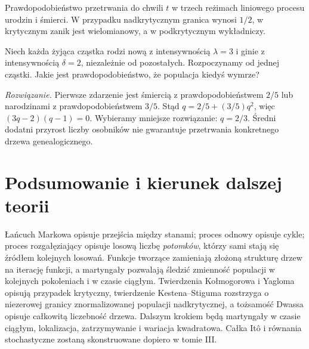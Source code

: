 \begin{center}
\par\smallskip\small Prawdopodobieństwo przetrwania
do chwili $t$ w trzech reżimach liniowego procesu
urodzin i śmierci. W przypadku nadkrytycznym
granica wynosi $1/2$, w krytycznym zanik jest
wielomianowy, a w podkrytycznym wykładniczy.
\end{center}

\begin{zadanie}
Niech każda żyjąca cząstka rodzi nową z intensywnością
$\lambda=3$ i ginie z intensywnością $\delta=2$,
niezależnie od pozostałych. Rozpoczynamy od jednej cząstki.
Jakie jest prawdopodobieństwo, że populacja kiedyś wymrze?

\emph{Rozwiązanie.} Pierwsze zdarzenie jest śmiercią
z prawdopodobieństwem $2/5$ lub narodzinami z prawdopodobieństwem
$3/5$. Stąd $q=2/5+(3/5)q^2$, więc
$(3q-2)(q-1)=0$.
Wybieramy mniejsze rozwiązanie: $q=2/3$.
Średni dodatni przyrost liczby osobników nie gwarantuje
przetrwania konkretnego drzewa genealogicznego.
\end{zadanie}




\section{Podsumowanie i kierunek dalszej teorii}
Łańcuch Markowa opisuje przejścia między stanami;
proces odnowy opisuje cykle; proces rozgałęziający
opisuje losową liczbę \emph{potomków}, którzy sami
stają się źródłem kolejnych losowań. Funkcje tworzące
zamieniają złożoną strukturę drzew na iterację funkcji,
a martyngały pozwalają śledzić zmienność populacji
w kolejnych pokoleniach i w czasie ciągłym.
Twierdzenia Kołmogorowa i Yagloma opisują przypadek
krytyczny, twierdzenie Kestena--Stiguma rozstrzyga
o niezerowej granicy znormalizowanej populacji
nadkrytycznej, a tożsamość Dwassa opisuje całkowitą
liczebność drzewa. Dalszym krokiem będą martyngały w czasie ciągłym, lokalizacja,
zatrzymywanie i wariacja kwadratowa. Całka Itô i równania
stochastyczne zostaną skonstruowane dopiero w tomie III.


